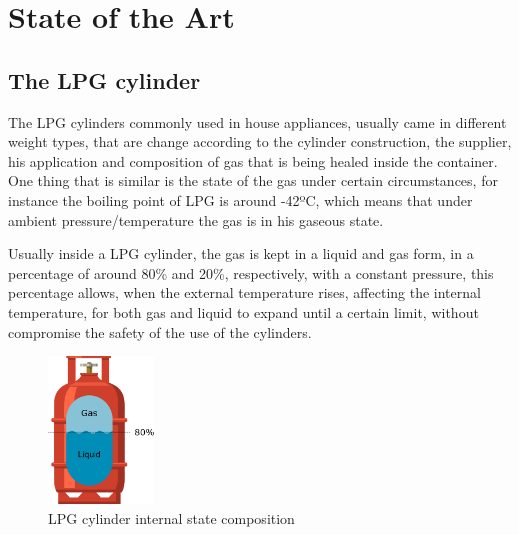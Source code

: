 \cleardoublepage
\chapter{State of the Art}%


\section{The LPG cylinder}
The LPG cylinders commonly used in house appliances, usually came in different weight types, that are change according to the cylinder construction, the supplier, his application and composition of gas that is being healed inside the container. One thing that is similar is the state of the gas under certain circumstances, for instance the boiling point of LPG is around -42ºC, which means that under ambient pressure/temperature the gas is in his gaseous state. 

Usually inside a LPG cylinder, the gas is kept in a liquid and gas form, in a percentage of around 80\% and 20\%, respectively, with a constant pressure, this percentage allows, when the external temperature rises, affecting the internal temperature, for both gas and liquid to expand until a certain limit, without compromise the safety of the use of the cylinders.
\begin{figure}[!htb]
    \centering
    \includegraphics[width=0.25\textwidth]{Chapters/2CHP/Diagrams/bottleBaseliqGas.eps}
    \caption{LPG cylinder internal state composition}
    \label{fig:intcomplpg}
\end{figure}

